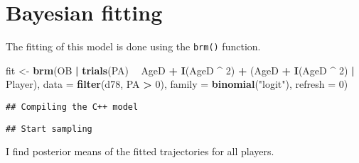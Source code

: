 \documentclass[
]{book}
\newenvironment{Shaded}{\begin{snugshade}}{\end{snugshade}}
\newcommand{\DataTypeTok}[1]{\textcolor[rgb]{0.13,0.29,0.53}{#1}}
\newcommand{\DecValTok}[1]{\textcolor[rgb]{0.00,0.00,0.81}{#1}}
\newcommand{\KeywordTok}[1]{\textcolor[rgb]{0.13,0.29,0.53}{\textbf{#1}}}
\newcommand{\NormalTok}[1]{#1}
\newcommand{\OperatorTok}[1]{\textcolor[rgb]{0.81,0.36,0.00}{\textbf{#1}}}
\newcommand{\StringTok}[1]{\textcolor[rgb]{0.31,0.60,0.02}{#1}}
\begin{document}
\hypertarget{bayesian-fitting}{%
\section{Bayesian fitting}\label{bayesian-fitting}}

The fitting of this model is done using the \texttt{brm()} function.

\begin{Shaded}
\begin{Highlighting}[]
\NormalTok{fit <-}\StringTok{ }\KeywordTok{brm}\NormalTok{(OB }\OperatorTok{|}\StringTok{ }\KeywordTok{trials}\NormalTok{(PA) }\OperatorTok{~}\StringTok{ }\NormalTok{AgeD }\OperatorTok{+}\StringTok{ }\KeywordTok{I}\NormalTok{(AgeD }\OperatorTok{^}\StringTok{ }\DecValTok{2}\NormalTok{) }\OperatorTok{+}
\StringTok{             }\NormalTok{(AgeD }\OperatorTok{+}\StringTok{ }\KeywordTok{I}\NormalTok{(AgeD }\OperatorTok{^}\StringTok{  }\DecValTok{2}\NormalTok{) }\OperatorTok{|}\StringTok{ }\NormalTok{Player),}
           \DataTypeTok{data =} \KeywordTok{filter}\NormalTok{(d78, PA }\OperatorTok{>}\StringTok{ }\DecValTok{0}\NormalTok{),}
           \DataTypeTok{family =} \KeywordTok{binomial}\NormalTok{(}\StringTok{"logit"}\NormalTok{),}
           \DataTypeTok{refresh =} \DecValTok{0}\NormalTok{)}
\end{Highlighting}
\end{Shaded}

\begin{verbatim}
## Compiling the C++ model
\end{verbatim}

\begin{verbatim}
## Start sampling
\end{verbatim}

I find posterior means of the fitted trajectories for all players.

\begin{Shaded}
\end{Shaded}
\end{document}
